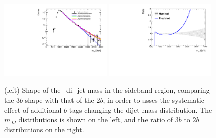 \begin{figure}[htbp!]
\begin{center} 
\includegraphics[angle=270, width=0.48\textwidth]{figures/boosted/Syst_Smooth/TopShapeSRSysfitSmooth_sig33_comp22.pdf}
\includegraphics[angle=270, width=0.48\textwidth]{figures/boosted/Syst_Smooth/TopShapeSRSysfitSmooth_sig33_comp22_ratio.pdf}
\caption{(left)  Shape of the \ttbar\ di-\largeR-jet mass in the sideband region,
comparing the $3b$ shape with that of the $2b$, in order to asses the systematic effect of additional $b$-tags changing the dijet mass distribution.  The $m_{JJ}$ distributions is shown on the left, and the ratio of $3b$ to $2b$ distributions on the right.}
\label{fig:ttbar-shapes-signal}
\end{center}
\end{figure}

%

